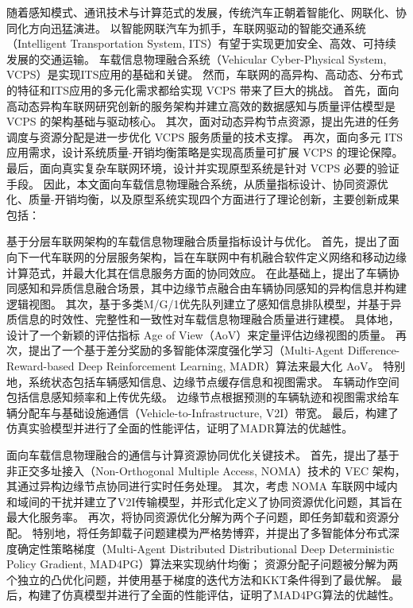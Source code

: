 \begin{cabstract}	%

随着感知模式、通讯技术与计算范式的发展，传统汽车正朝着智能化、网联化、协同化方向迅猛演进。
以智能网联汽车为抓手，车联网驱动的智能交通系统（Intelligent Transportation System, ITS）有望于实现更加安全、高效、可持续发展的交通运输。
车载信息物理融合系统（Vehicular Cyber-Physical System, VCPS）是实现ITS应用的基础和关键。
然而，车联网的高异构、高动态、分布式的特征和ITS应用的多元化需求都给实现 VCPS 带来了巨大的挑战。
首先，面向高动态异构车联网研究创新的服务架构并建立高效的数据感知与质量评估模型是 VCPS 的架构基础与驱动核心。
其次，面对动态异构节点资源，提出先进的任务调度与资源分配是进一步优化 VCPS 服务质量的技术支撑。
再次，面向多元 ITS 应用需求，设计系统质量-开销均衡策略是实现高质量可扩展 VCPS 的理论保障。
最后，面向真实复杂车联网环境，设计并实现原型系统是针对 VCPS 必要的验证手段。
因此，本文面向车载信息物理融合系统，从质量指标设计、协同资源优化、质量-开销均衡，以及原型系统实现四个方面进行了理论创新，主要创新成果包括：

 基于分层车联网架构的车载信息物理融合质量指标设计与优化。
首先，提出了面向下一代车联网的分层服务架构，旨在车联网中有机融合软件定义网络和移动边缘计算范式，并最大化其在信息服务方面的协同效应。
在此基础上，提出了车辆协同感知和异质信息融合场景，其中边缘节点融合由车辆协同感知的异构信息并构建逻辑视图。
其次，基于多类M/G/1优先队列建立了感知信息排队模型，并基于异质信息的时效性、完整性和一致性对车载信息物理融合质量进行建模。
具体地，设计了一个新颖的评估指标 Age of View（AoV）来定量评估边缘视图的质量。 
再次，提出了一个基于差分奖励的多智能体深度强化学习（Multi-Agent Difference-Reward-based Deep Reinforcement Learning, MADR）算法来最大化 AoV。
特别地，系统状态包括车辆感知信息、边缘节点缓存信息和视图需求。
车辆动作空间包括信息感知频率和上传优先级。
边缘节点根据预测的车辆轨迹和视图需求给车辆分配车与基础设施通信（Vehicle-to-Infrastructure, V2I）带宽。
最后，构建了仿真实验模型并进行了全面的性能评估，证明了MADR算法的优越性。

 面向车载信息物理融合的通信与计算资源协同优化关键技术。
首先，提出了基于非正交多址接入（Non-Orthogonal Multiple Access, NOMA）技术的 VEC 架构，其通过异构边缘节点协同进行实时任务处理。
其次，考虑 NOMA 车联网中域内和域间的干扰并建立了V2I传输模型，并形式化定义了协同资源优化问题，其旨在最大化服务率。
再次，将协同资源优化分解为两个子问题，即任务卸载和资源分配。
特别地，将任务卸载子问题建模为严格势博弈，并提出了多智能体分布式深度确定性策略梯度（Multi-Agent Distributed Distributional Deep Deterministic Policy Gradient, MAD4PG）算法来实现纳什均衡；
资源分配子问题被分解为两个独立的凸优化问题，并使用基于梯度的迭代方法和KKT条件得到了最优解。
最后，构建了仿真模型并进行了全面的性能评估，证明了MAD4PG算法的优越性。


\end{cabstract}
